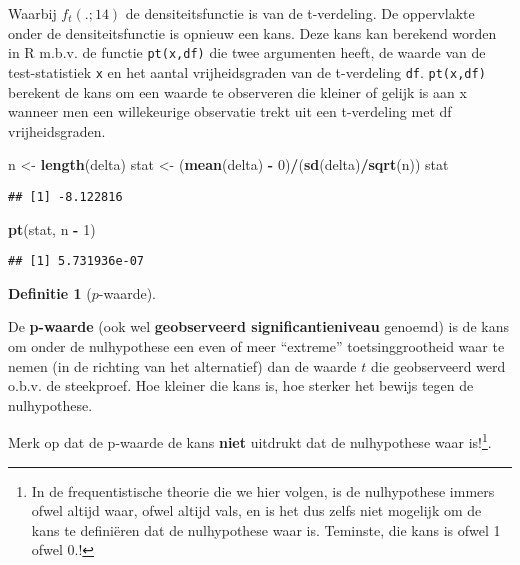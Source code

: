 \documentclass[
  12pt,dutch,coursenotes]{book}
\newenvironment{Shaded}{\begin{snugshade}}{\end{snugshade}}
\newcommand{\DecValTok}[1]{\textcolor[rgb]{0.00,0.00,0.81}{#1}}
\newcommand{\KeywordTok}[1]{\textcolor[rgb]{0.13,0.29,0.53}{\textbf{#1}}}
\newcommand{\NormalTok}[1]{#1}
\newcommand{\OperatorTok}[1]{\textcolor[rgb]{0.81,0.36,0.00}{\textbf{#1}}}
\newcommand{\StringTok}[1]{\textcolor[rgb]{0.31,0.60,0.02}{#1}}
\theoremstyle{definition}
\newtheorem{definition}{Definitie}[chapter]
\theoremstyle{definition}
\theoremstyle{definition}
\theoremstyle{remark}
\begin{document}
Waarbij \(f_t(.;14)\) de densiteitsfunctie is van de t-verdeling.
De oppervlakte onder de densiteitsfunctie is opnieuw een kans.
Deze kans kan berekend worden in R m.b.v. de functie \texttt{pt(x,df)} die twee argumenten heeft, de waarde van de test-statistiek \texttt{x} en het aantal vrijheidsgraden van de t-verdeling \texttt{df}.
\texttt{pt(x,df)} berekent de kans om een waarde te observeren die kleiner of gelijk is aan x wanneer men een willekeurige observatie trekt uit een t-verdeling met df vrijheidsgraden.

\begin{Shaded}
\begin{Highlighting}[]
\NormalTok{n \textless{}{-}}\StringTok{ }\KeywordTok{length}\NormalTok{(delta)}
\NormalTok{stat \textless{}{-}}\StringTok{ }\NormalTok{(}\KeywordTok{mean}\NormalTok{(delta) }\OperatorTok{{-}}\StringTok{ }\DecValTok{0}\NormalTok{)}\OperatorTok{/}\NormalTok{(}\KeywordTok{sd}\NormalTok{(delta)}\OperatorTok{/}\KeywordTok{sqrt}\NormalTok{(n))}
\NormalTok{stat}
\end{Highlighting}
\end{Shaded}

\begin{verbatim}
## [1] -8.122816
\end{verbatim}

\begin{Shaded}
\begin{Highlighting}[]
\KeywordTok{pt}\NormalTok{(stat, n }\OperatorTok{{-}}\StringTok{ }\DecValTok{1}\NormalTok{)}
\end{Highlighting}
\end{Shaded}

\begin{verbatim}
## [1] 5.731936e-07
\end{verbatim}

\begin{definition}[$p$-waarde]
\protect\hypertarget{def:unnamed-chunk-163}{}{\label{def:unnamed-chunk-163} \iffalse (\(p\)-waarde) \fi{} }
\end{definition}
De \textbf{p-waarde} (ook wel \textbf{geobserveerd significantieniveau} genoemd) is de
kans om onder de nulhypothese een even of meer ``extreme'' toetsinggrootheid
waar te nemen (in de richting van het alternatief) dan de waarde \(t\) die
geobserveerd werd o.b.v. de steekproef. Hoe kleiner die kans is, hoe sterker het bewijs tegen de
nulhypothese.

Merk op dat de p-waarde de kans \textbf{niet} uitdrukt dat de nulhypothese waar is!\footnote{In de frequentistische theorie die we hier volgen, is de nulhypothese immers ofwel altijd waar, ofwel altijd vals, en is het dus zelfs niet mogelijk om de kans te definiëren dat de nulhypothese waar is. Teminste, die kans is ofwel 1 ofwel 0.!}.
\end{document}
